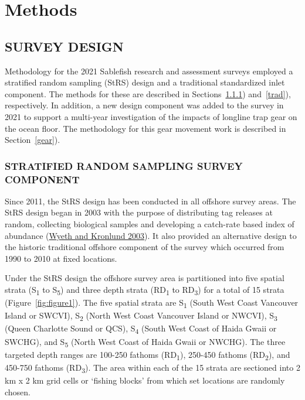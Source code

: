 \documentclass[12pt]{article}\usepackage[]{graphicx}\usepackage[]{color}
\begin{document}
\clearpage

\hypertarget{methods}{%
\section{Methods}\label{methods}}

\hypertarget{survey-design}{%
\subsection{SURVEY DESIGN}\label{survey-design}}

Methodology for the 2021 Sablefish research and assessment surveys employed a stratified random sampling (StRS) design and a traditional standardized inlet component. The methods for these are described in Sections~\ref{strs}) and~\ref{trad}), respectively. In addition, a new design component was added to the survey in 2021 to support a multi-year investigation of the impacts of longline trap gear on the ocean floor. The methodology for this gear movement work is described in Section~\ref{gear}).

\hypertarget{strs}{%
\subsubsection{STRATIFIED RANDOM SAMPLING SURVEY COMPONENT}\label{strs}}

Since 2011, the StRS design has been conducted in all offshore survey areas. The StRS design began in 2003 with the purpose of distributing tag releases at random, collecting biological samples and developing a catch-rate based index of abundance (\protect\hyperlink{ref-Wyeth2003}{Wyeth and Kronlund 2003}). It also provided an alternative design to the historic traditional offshore component of the survey which occurred from 1990 to 2010 at fixed locations.

Under the StRS design the offshore survey area is partitioned into five spatial strata (S\textsubscript{1} to S\textsubscript{5}) and three depth strata (RD\textsubscript{1} to RD\textsubscript{3}) for a total of 15 strata (Figure~\ref{fig:figure1}). The five spatial strata are S\textsubscript{1} (South West Coast Vancouver Island or SWCVI), S\textsubscript{2} (North West Coast Vancouver Island or NWCVI), S\textsubscript{3} (Queen Charlotte Sound or QCS), S\textsubscript{4} (South West Coast of Haida Gwaii or SWCHG), and S\textsubscript{5} (North West Coast of Haida Gwaii or NWCHG). The three targeted depth ranges are 100-250 fathoms (RD\textsubscript{1}), 250-450 fathoms (RD\textsubscript{2}), and 450-750 fathoms (RD\textsubscript{3}). The area within each of the 15 strata are sectioned into 2 km x 2 km grid cells or `fishing blocks' from which set locations are randomly chosen.
\end{document}
